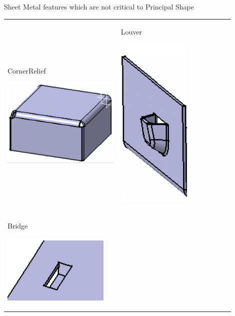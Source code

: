 \begin{frame}{Sheet Metal features which are not critical to Principal Shape}
\begin{tabular}[h]{@{} p{0.45\linewidth} p{0.45\linewidth}@{}}

CornerRelief

\includegraphics[width=0.8\linewidth]{..//Common/images/Feature_CornerRelief.png} &

Louver

\includegraphics[width=0.3\linewidth]{..//Common/images/Feature_Louver.png} \\

Bridge

\includegraphics[width=0.8\linewidth]{..//Common/images/Feature_Bridge.png} &


\end{tabular}
\end{frame}
